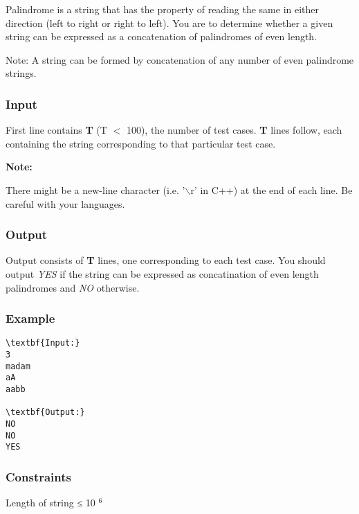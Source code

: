 







   Palindrome is a string that has the property of reading the same in either direction (left to right or right to left). You are to determine whether a given string can be expressed as a concatenation of palindromes of even length.  

   Note: A string can be formed by concatenation of any number of even palindrome strings.  

\subsubsection{   Input  }

   First line contains   \textbf{    T   }   (T $<$ 100), the number of test cases.   \textbf{    T   }   lines follow, each containing the string corresponding to that particular test case.  

\textbf{    Note:   }

   There might be a new-line character (i.e. '$\backslash$r' in C++) at the end of each line. Be careful with your languages.  

\subsubsection{   Output  }

   Output consists of   \textbf{    T   }   lines, one corresponding to each test case. You should output   \emph{    YES   }   if the string can be expressed as concatination of even length palindromes and   \emph{    NO   }   otherwise.  

\subsubsection{   Example  }
\begin{verbatim}
\textbf{Input:}
3
madam
aA
aabb

\textbf{Output:}
NO
NO
YES 
\end{verbatim}

\subsubsection{   Constraints  }

   Length of string ≤ 10   $^    6   $

